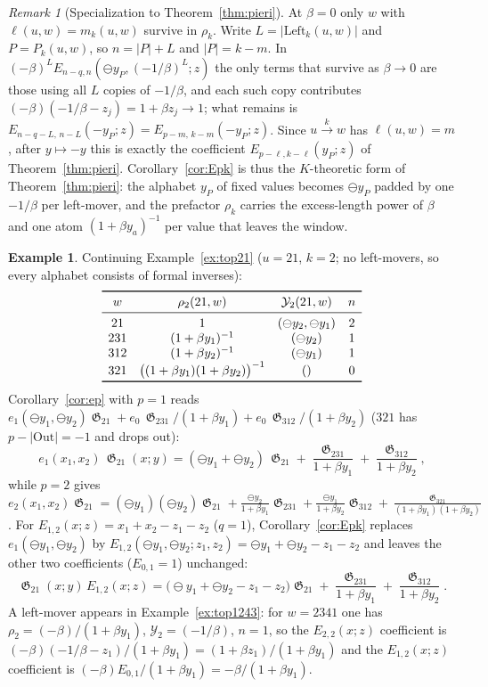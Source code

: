\documentclass{amsart}
\theoremstyle{definition}
\newtheorem{example}[theorem]{Example}
\theoremstyle{remark}
\newtheorem{remark}[theorem]{Remark}
\DeclareMathOperator{\groth}{\mathfrak{G}}
\newcommand{\tom}[1]{\ensuremath{\xrightarrow{#1}}}
\newcommand{\fgn}{\ominus}
\newcommand{\Lft}{\mathrm{Left}}
\newcommand{\Out}{\mathrm{Out}}
\begin{document}
\begin{remark}[Specialization to Theorem~\ref{thm:pieri}]
At $\beta=0$ only $w$ with $\ell(u,w)=m_k(u,w)$ survive in $\rho_k$. Write $L=|\Lft_k(u,w)|$
and $P=P_k(u,w)$, so $n = |P|+L$ and $|P| = k-m$. In
$(-\beta)^{L}E_{n-q,n}(\fgn y_P,(-1/\beta)^{L};z)$ the only terms that survive as $\beta\to0$ are
those using all $L$ copies of $-1/\beta$, and each such copy contributes
$(-\beta)(-1/\beta - z_j) = 1+\beta z_j\to1$; what remains is $E_{n-q-L,\,n-L}(-y_P;z)
= E_{p-m,\,k-m}(-y_P;z)$. Since $u\tom{k}w$ has $\ell(u,w)=m$, after $y\mapsto-y$ this is
exactly the coefficient $E_{p-\ell,k-\ell}(y_P;z)$ of Theorem~\ref{thm:pieri}.
Corollary~\ref{cor:Epk} is thus the $K$-theoretic form of Theorem~\ref{thm:pieri}: the
alphabet $y_P$ of fixed values becomes $\fgn y_P$ padded by one $-1/\beta$ per left-mover, and
the prefactor $\rho_k$ carries the excess-length power of $\beta$ and one atom
$(1+\beta y_a)^{-1}$ per value that leaves the window.
\end{remark}

\begin{example}
Continuing Example~\ref{ex:top21} ($u=21$, $k=2$; no left-movers, so every alphabet consists of
formal inverses):
\[
\begin{array}{c c c c}
\toprule
w & \rho_2(21,w) & \mathcal{Y}_2(21,w) & n \\
\midrule
21  & 1 & (\fgn y_2,\fgn y_1) & 2\\
231 & (1+\beta y_1)^{-1} & (\fgn y_2) & 1\\
312 & (1+\beta y_2)^{-1} & (\fgn y_1) & 1\\
321 & \bigl((1+\beta y_1)(1+\beta y_2)\bigr)^{-1} & () & 0\\
\bottomrule
\end{array}
\]
Corollary~\ref{cor:ep} with $p=1$ reads $e_1(\fgn y_1,\fgn y_2)\groth_{21} + e_0\,\groth_{231}/(1+\beta y_1) + e_0\,\groth_{312}/(1+\beta y_2)$
($321$ has $p-|\Out| = -1$ and drops out):
\[
e_1(x_1,x_2)\,\groth_{21}(x;y) = (\fgn y_1 + \fgn y_2)\,\groth_{21} + \frac{\groth_{231}}{1+\beta y_1} + \frac{\groth_{312}}{1+\beta y_2},
\]
while $p=2$ gives $e_2(x_1,x_2)\groth_{21} = (\fgn y_1)(\fgn y_2)\groth_{21} + \frac{\fgn y_2}{1+\beta y_1}\groth_{231}
+ \frac{\fgn y_1}{1+\beta y_2}\groth_{312} + \frac{\groth_{321}}{(1+\beta y_1)(1+\beta y_2)}$.
For $E_{1,2}(x;z) = x_1+x_2-z_1-z_2$ ($q=1$), Corollary~\ref{cor:Epk} replaces
$e_1(\fgn y_1,\fgn y_2)$ by $E_{1,2}(\fgn y_1,\fgn y_2;z_1,z_2) = \fgn y_1+\fgn y_2 - z_1 - z_2$
and leaves the other two coefficients ($E_{0,1}=1$) unchanged:
\[
\groth_{21}(x;y)\,E_{1,2}(x;z) = \bigl(\fgn y_1 + \fgn y_2 - z_1 - z_2\bigr)\groth_{21}
+ \frac{\groth_{231}}{1+\beta y_1} + \frac{\groth_{312}}{1+\beta y_2}.
\]
A left-mover appears in Example~\ref{ex:top1243}: for $w=2341$ one has $\rho_2 = (-\beta)/(1+\beta y_1)$,
$\mathcal{Y}_2 = (-1/\beta)$, $n=1$, so the $E_{2,2}(x;z)$ coefficient is
$(-\beta)(-1/\beta - z_1)/(1+\beta y_1) = (1+\beta z_1)/(1+\beta y_1)$ and the $E_{1,2}(x;z)$
coefficient is $(-\beta)E_{0,1}/(1+\beta y_1) = -\beta/(1+\beta y_1)$.
\end{example}
\end{document}
